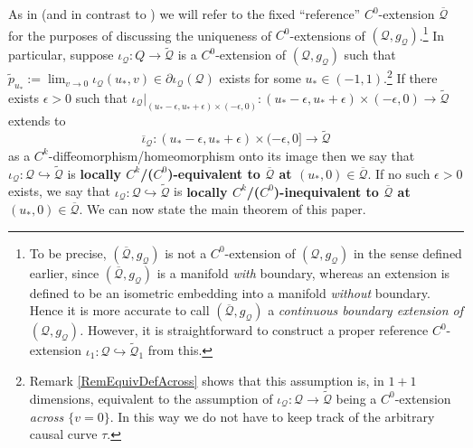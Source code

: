 \documentclass{article}
\newcommand{\Q}{\mathcal{Q}}
\begin{document}
As in \cite{CameronSbierski} (and in contrast to \cite{sbierski2022uniqueness}) we will refer to the fixed ``reference'' $C^0$-extension $\overline{\Q}$ for the purposes of discussing the uniqueness of $C^0$-extensions of $(\Q,g_\Q)$.\footnote{To be precise, $(\overline{\Q}, g_\Q)$ is not a $C^0$-extension of $(\Q, g_\Q)$ in the sense defined earlier, since $(\overline{\Q}, g_\Q)$ is a manifold \emph{with} boundary, whereas an extension is defined to be an isometric embedding into a manifold \emph{without} boundary. Hence it is more accurate to call $(\overline{\Q}, g_\Q)$ a \emph{continuous boundary extension of $(\Q, g_\Q)$.} However, it is straightforward to construct a proper reference $C^0$-extension $\iota_1 : \Q\hookrightarrow \tilde{\Q}_1$ from this.} In particular, suppose $\iota_\Q:Q\to\tilde{\Q}$ is a $C^0$-extension of $(\Q,g_\Q)$ such that $\tilde{p}_{u_*}:=\lim_{v \to 0}\iota_{\Q}(u_*,v) \in \partial\iota_\Q(\Q)$ exists for some $u_*\in(-1,1)$.\footnote{Remark \ref{RemEquivDefAcross} shows that this assumption is, in $1+1$ dimensions, equivalent to the assumption of $\iota_{\Q} : \Q \to \tilde{\Q}$ being a $C^0$-extension \emph{across $\{v=0\}$}. In this way we do not have to keep track of the arbitrary causal curve $\tau$.} If there exists $\epsilon>0$ such that $\iota_{\Q}\vert_{(u_* - \epsilon, u_* + \epsilon) \times (-\epsilon,0) } : (u_* - \epsilon, u_* + \epsilon) \times (-\epsilon,0)\to \tilde{\Q}$ extends  to $$\overline{\iota}_{\Q} : (u_* - \epsilon, u_* + \epsilon) \times (-\epsilon,0] \to \tilde{\Q}$$
as a $C^k$-diffeomorphism/homeomorphism onto its image then we say that $\iota_\Q : \Q \hookrightarrow \tilde{\Q}$ is \textbf{locally $C^k$/($C^0$)-equivalent to $\overline{\Q}$ at $(u_*, 0) \in \overline{\Q}$}.
If no such $\epsilon>0$ exists, we say that $\iota_\Q : \Q \hookrightarrow \tilde{\Q}$ is \textbf{locally $C^k$/($C^0$)-inequivalent to $\overline{\Q}$ at $(u_*, 0) \in \overline{\Q}$}. We can now state the main theorem of this paper.
\end{document}
